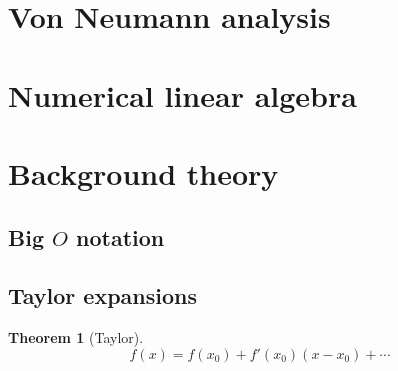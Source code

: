 \documentclass[11pt, a4paper]{article}
\theoremstyle{break}
\newtheorem{thm}{Theorem}[section]
\begin{document}
\section{Von Neumann analysis}


\section{Numerical linear algebra}\label{sec:numla}


\appendix
\section{Background theory}
\subsection{\texorpdfstring{Big $O$}{Big O} notation}\label{sec:bigO}
\subsection{Taylor expansions}\label{sec:taylor}
\begin{thm}[Taylor]\label{thm:taylor}
	\[f(x)=f(x_0)+f'(x_0)(x-x_0) + \cdots\]
\end{thm}

\nocite{*}



\label{lastpage}
\end{document}
